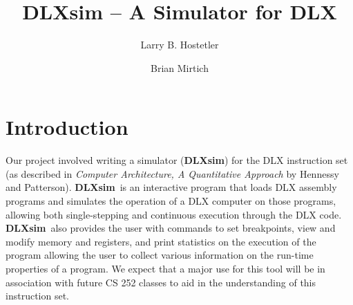 \newcommand{\SingleSpace}{\edef\baselinestretch{0.9}\Huge\normalsize}
\newcommand{\DoubleSpace}{\edef\baselinestretch{1.4}\Huge\normalsize}
\newcommand{\QuadSpace}{\edef\baselinestretch{2.2}\Huge\normalsize}
\newcommand{\dlxsim}{{\bf DLXsim}}
\newcommand{\code}[1]{{\sf #1}}
\newcommand{\dlxcom}[1]{{\bf (dlxsim) {\tt #1}}}
\newcommand{\instr}[4]{#1 & {\bf #2} & #3 & #4 \\}
\newenvironment{assembly}{\begin{tabular}{llll}}{\end{tabular}}
\newenvironment{mylist}{\begin{list}{}{\leftmargin .6in \labelwidth .5in \labelsep .1in \itemsep .1in}}{\end{list}{}{}}
\newenvironment{commandlevel}{\begin{list}{}{}}{\end{list}{}{}}
\newenvironment{summary}[1]{\if@twocolumn
\section*{#1} \else
\begin{center}
{\bf #1\vspace{-.5em}\vspace{0pt}}
\end{center}
\quotation
\fi}{\if@twocolumn\else\endquotation\fi}
\setlength{\oddsidemargin}{0in}
\setlength{\evensidemargin}{0in}
\setlength{\headsep}{18pt}
\setlength{\topmargin}{0pt} 
\setlength{\textheight}{8.7in}
\setlength{\textwidth}{6.5in}

\title{DLXsim -- A Simulator for DLX}
\author{Larry B. Hostetler \and Brian Mirtich}
\maketitle

\section{Introduction}

Our project involved writing a simulator ({\dlxsim}) for the DLX
instruction set (as described in {\em Computer Architecture, A
Quantitative Approach} by Hennessy and Patterson).
\dlxsim\ is an interactive program that loads DLX assembly programs
and simulates the operation of a DLX computer on those programs,
allowing both single-stepping and continuous execution through the DLX
code.  \dlxsim\ also provides the user with commands to set
breakpoints, view and modify memory and registers, and print statistics on the
execution of the program allowing the user to collect various
information on the run-time properties of a program.  We expect that a
major use for this tool will be in association with future CS 252
classes to aid in the understanding of this instruction set.

